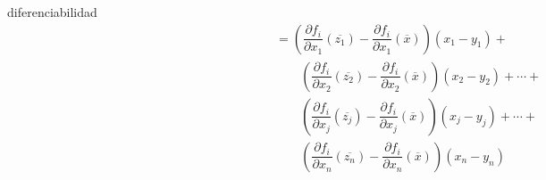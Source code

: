 \documentclass[12pt]{article}
\newenvironment{ejercicio}[1]{\begin{ejer}[breakable, pad at break = 5mm, leftrule = 0.7mm, rightrule = 0.7mm, right = 2mm, left = 2mm, enlarge bottom finally by = 3mm, fontlower = \setlength{\parskip}{2mm}]{}{#1}}{\end{ejer}}
\begin{document}
\begin{ejercicio}{diferenciabilidad}
		\begin{equation*}
			\begin{split}
				\phantom{f_i(\overline{x}) - f_i(\overline{y}) - \sum_{j=1}^{n} \dfrac{\partial f_i}{\partial x_j} (\overline{x}) \left( x_j - y_j \right)} &= \left( \dfrac{\partial f_i}{\partial x_1} (\overline{z_1}) - \dfrac{\partial f_i}{\partial x_1} (\overline{x}) \right) \left( x_1 - y_1 \right) + \\
				& \qquad \left( \dfrac{\partial f_i}{\partial x_2} (\overline{z_2}) - \dfrac{\partial f_i}{\partial x_2} (\overline{x}) \right) \left( x_2 - y_2 \right) + \cdots + \\
				& \qquad \left( \dfrac{\partial f_i}{\partial x_j} (\overline{z_j}) - \dfrac{\partial f_i}{\partial x_j} (\overline{x}) \right) \left( x_j - y_j \right) + \cdots + \\
				& \qquad \left( \dfrac{\partial f_i}{\partial x_n} (\overline{z_n}) - \dfrac{\partial f_i}{\partial x_n} (\overline{x}) \right) \left( x_n - y_n \right)
			\end{split}
		\end{equation*}


\end{ejercicio}
\end{document}
